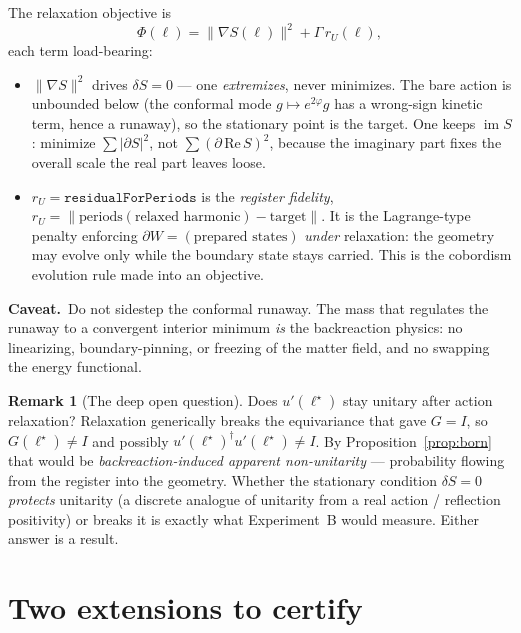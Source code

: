 \documentclass[11pt]{article}
\DeclareMathOperator{\im}{im}
\newcommand{\norm}[1]{\lVert #1 \rVert}
\newcommand{\abs}[1]{\lvert #1 \rvert}
\newcommand{\bd}{\partial}
\newcommand{\rU}{r_{U}}
\newcommand{\code}[1]{\texttt{#1}}
\theoremstyle{plain}
\theoremstyle{definition}
\newtheorem{remark}[theorem]{Remark}
\newcommand{\caveat}[1]{\par\noindent\textcolor{red!60!black}{\textbf{Caveat.}}\ #1\par}
\begin{document}
The relaxation objective is
\begin{equation}
  \Phi(\ell) = \norm{\nabla S(\ell)}^2 + \Gamma\,\rU(\ell),
  \label{eq:Phi}
\end{equation}
each term load-bearing:
\begin{itemize}[nosep]
  \item $\norm{\nabla S}^2$ drives $\delta S=0$ --- one \emph{extremizes}, never minimizes.
        The bare action is unbounded below (the conformal mode $g\mapsto e^{2\varphi}g$ has a
        wrong-sign kinetic term, hence a runaway), so the stationary point is the target. One
        keeps $\im S$: minimize $\sum\abs{\bd S}^2$, not $\sum(\bd\,\mathrm{Re}\,S)^2$, because
        the imaginary part fixes the overall scale the real part leaves loose.
  \item $\rU=\code{residualForPeriods}$ is the \emph{register fidelity},
        $\rU=\norm{\text{periods}(\text{relaxed harmonic})-\text{target}}$. It is the
        Lagrange-type penalty enforcing $\bd W=(\text{prepared states})$ \emph{under}
        relaxation: the geometry may evolve only while the boundary state stays carried. This
        is the cobordism evolution rule made into an objective.
\end{itemize}

\caveat{Do not sidestep the conformal runaway. The mass that regulates the runaway to a
convergent interior minimum \emph{is} the backreaction physics: no linearizing,
boundary-pinning, or freezing of the matter field, and no swapping the energy functional.}

\begin{remark}[The deep open question]
Does $u'(\ell^\star)$ stay unitary after action relaxation? Relaxation generically breaks the
equivariance that gave $G=I$, so $G(\ell^\star)\neq I$ and possibly
$u'(\ell^\star)^\dagger u'(\ell^\star)\neq I$. By Proposition~\ref{prop:born} that would be
\emph{backreaction-induced apparent non-unitarity} --- probability flowing from the register
into the geometry. Whether the stationary condition $\delta S=0$ \emph{protects} unitarity (a
discrete analogue of unitarity from a real action / reflection positivity) or breaks it is
exactly what Experiment~B would measure. Either answer is a result.
\end{remark}

\section{Two extensions to certify}
\label{sec:experiments}
\end{document}

